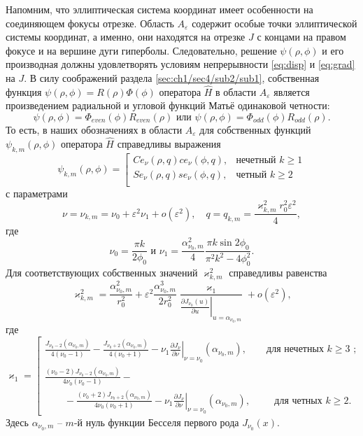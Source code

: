 Напомним, что эллиптическая система координат имеет особенности на соединяющем фокусы отрезке. Область $A_\varepsilon$ содержит особые точки эллиптической системы координат, а именно, они находятся на отрезке $J$ с концами на правом фокусе и на вершине дуги гиперболы.
Следовательно, решение $\psi(\rho, \phi)$ и его производная должны удовлетворять условиям непрерывности \eqref{eq:disp} и \eqref{eq:grad} на  $J$.
В силу соображений раздела \ref{sec:ch1/sec4/sub2/sub1}, собственная функция  $\psi(\rho,\phi)=R(\rho) \Phi(\phi)$ оператора $\hat{H}$ в области $A_\varepsilon$ является произведением радиальной и угловой функций Матьё одинаковой четности:
$$ \psi(\rho,\phi) = \Phi_{even}(\phi) R_{even}(\rho)  
\text{ или }
 \psi(\rho,\phi) = \Phi_{odd}(\phi) R_{odd}(\rho) .  $$
То есть, в наших обозначениях в области $A_\varepsilon$ для собственных функций $\psi_{k, m}(\rho, \phi)$ оператора   $\hat{H}$ справедливы выражения
\begin{equation}
\psi_{k, m}(\rho, \phi) = 
\left[
\begin{array}{ll}
    Ce_\nu(\rho, q) ce_\nu(\phi, q) ,   &    \text{нечетный $k \geq 1$}\\
    Se_\nu(\rho, q) se_\nu(\phi, q) ,   &    \text{четный $k \geq 2$}\\
\end{array}
\right.\label{eq:fun}
\end{equation}
с параметрами
\[
\nu = \nu_{k,m} = \nu_0+ \varepsilon^2 \nu_1 + o(\varepsilon^2),  \quad q=q_{k,m} = \dfrac{\varkappa_{k,m}^2 r_0^2 \varepsilon^2}{4},
\]
где
$$\nu_0 = \frac{\pi k}{2\phi_0}\text{\ \  и\  \  }\nu_1=\frac{\alpha_{\nu_0, m}^2}{4} \frac{\pi k \sin 2\phi_0}{\pi^2 k^2 - 4\phi_0^2}  .$$
Для соответствующих собственных  значений  $\varkappa^2_{k, m}$ справедливы равенства
\begin{equation}
\varkappa^2_{k, m} = \dfrac{\alpha_{\nu_0, m}^2}{r_0^2} +
\varepsilon^2 \dfrac{\alpha_{\nu_0, m}^3}{2 r_0^2}\dfrac{\varkappa_1 }{ \left.\frac{\partial J_{\nu_0}(u)}{\partial u}\right|_{u=\alpha_{\nu_0, m}} } + o(\varepsilon^2),\label{eq:val}
\end{equation}
где
\begin{equation*}
    \varkappa_1 = 
    \left[
\begin{array}{ll}
\frac{J_{\nu_0-2}(\alpha_{\nu_0, m})}{4(\nu_0-1)} - \frac{J_{\nu_0+2}(\alpha_{\nu_0, m})}{4(\nu_0+1)} 
  - \nu_1 \left.\frac{\partial J_\nu}{\partial \nu}\right|_{\nu=\nu_0}(\alpha_{\nu_0, m}),\qquad \text{для нечетных $k\geq 3$ ;} \\[10pt]
\frac{(\nu_0 - 2)J_{\nu_0-2}(\alpha_{\nu_0, m})   }{4\nu_0 (\nu_0-1)} -\\
\qquad - \frac{(\nu_0 + 2)J_{\nu_0+2}(\alpha_{\nu_0, m})}{4\nu_0 (\nu_0+1)}  
- \nu_1 \left.\frac{\partial J_\nu}{\partial \nu}\right|_{\nu = \nu_0}(\alpha_{\nu_0, m}), \qquad \ \ \!    \text{для четных $k \geq 2$}.        
\end{array}
\right.
\end{equation*}
Здесь $\alpha_{\nu_0,m}$ --  $m$-й нуль функции Бесселя первого рода $J_{\nu_0}(x)$.


